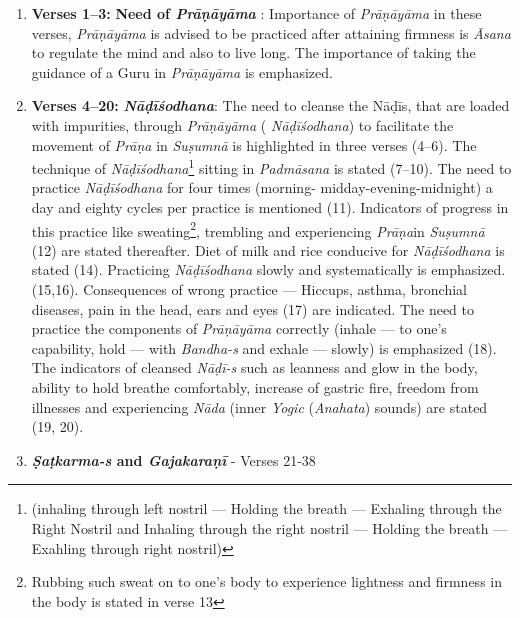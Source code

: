 \begin{enumerate}
\item \textbf{Verses 1--3:} \textbf{Need of \textit{Prāṇāyāma}} : Importance of \textit{Prāṇāyāma} in these verses, \textit{Prāṇāyāma} is advised  to be practiced after attaining  firmness is \textit{Āsana} to regulate the mind  and also to live long. The importance of taking the guidance of a Guru in  \textit{Prāṇāyāma} is emphasized.  

\item \textbf{Verses 4--20:} \textbf{\textit{Nāḍīśodhana}}: The need to cleanse the Nāḍīs, that are loaded with impurities, through \textit{Prāṇāyāma} ( \textit{Nāḍīśodhana}) to facilitate the movement of \textit{Prāṇa} in \textit{Suṣumnā} is highlighted in three verses (4--6). The technique of \textit{Nāḍīśodhana}\footnote{(inhaling through left nostril --- Holding the breath --- Exhaling through the Right Nostril and Inhaling through the right nostril --- Holding the breath --- Exahling through right nostril)} sitting in \textit{Padmāsana} is stated (7--10). The need to practice \textit{Nāḍīśodhana} for four times (morning- midday-evening-midnight) a day and eighty cycles per practice is mentioned (11). Indicators of progress in this practice like sweating\footnote{Rubbing such sweat on to one’s body to experience lightness and firmness in the body is stated in verse 13}, trembling and experiencing \textit{Prāṇa}in \textit{Suṣumnā} (12) are stated thereafter. Diet of milk and rice conducive for \textit{Nāḍīśodhana} is stated (14). Practicing \textit{Nāḍīśodhana} slowly and systematically is emphasized. (15,16).  Consequences of wrong practice --- Hiccups, asthma, bronchial diseases, pain in the head, ears and eyes (17) are indicated. The need to practice the components of \textit{Prāṇāyāma} correctly (inhale --- to one’s capability, hold --- with \textit{Bandha-s}  and exhale --- slowly) is emphasized (18).  The indicators of cleansed \textit{Nāḍī-s} such as leanness and glow in the body, ability to hold breathe comfortably, increase of gastric fire, freedom from illnesses and experiencing \textit{Nāda} (inner \textit{Yogic} (\textit{Anahata}) sounds) are stated (19, 20).

\item \textbf{\textit{Ṣaṭkarma-s} and \textit{Gajakaraṇī}} - Verses  21-38


\end{enumerate}
